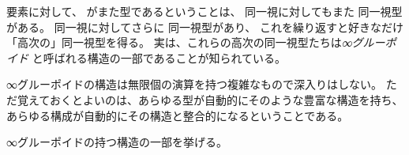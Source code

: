 \documentclass[index]{subfiles}
\begin{document}

要素に対して、
がまた型であるということは、
同一視に対してもまた
同一視型がある。
同一視に対してさらに
同一視型があり、
これを繰り返すと好きなだけ「高次の」同一視型を得る。
実は、これらの高次の同一視型たちは\emph{∞グルーポイド}
と呼ばれる構造の一部であることが知られている。

∞グルーポイドの構造は無限個の演算を持つ複雑なもので深入りはしない。
ただ覚えておくとよいのは、あらゆる型が自動的にそのような豊富な構造を持ち、
あらゆる構成が自動的にその構造と整合的になるということである。

∞グルーポイドの持つ構造の一部を挙げる。




\end{document}
